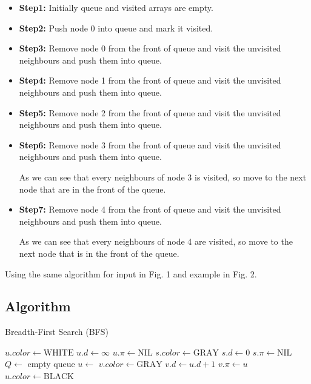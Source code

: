 \documentclass[lettersize,journal]{IEEEtran}
\begin{document}
\begin{itemize}
    \item {\textbf{Step1:} Initially queue and visited arrays are empty.}
    \item {\textbf{Step2:} Push node 0 into queue and mark it visited.}
    \item {\textbf{Step3:} Remove node 0 from the front of queue and visit the unvisited neighbours and push them into queue.}
    \item {\textbf{Step4:} Remove node 1 from the front of queue and visit the unvisited neighbours and push them into queue.}
    \item {\textbf{Step5:} Remove node 2 from the front of queue and visit the unvisited neighbours and push them into queue.}
    \item {\textbf{Step6:} Remove node 3 from the front of queue and visit the unvisited neighbours and push them into queue. 
    
    As we can see that every neighbours of node 3 is visited, so move to the next node that are in the front of the queue.}
    \item {\textbf{Step7:} Remove node 4 from the front of queue and visit the unvisited neighbours and push them into queue. 
    
    As we can see that every neighbours of node 4 are visited, so move to the next node that is in the front of the queue.}
    
\end{itemize}

Using the same algorithm for input in Fig. 1 and example in Fig. 2. \cite{bfs_gfg}

\subsection{Algorithm}

\begin{algorithm}[H]
\caption{Breadth-First Search (BFS)}\label{alg:bfs}
\begin{algorithmic}
        \State $u.color \gets \text{WHITE}$
        \State $u.d \gets \infty$
        \State $u.\pi \gets \text{NIL}$
    \EndFor
    \State $s.color \gets \text{GRAY}$
    \State $s.d \gets 0$
    \State $s.\pi \gets \text{NIL}$
    \State $Q \gets$ empty queue
    \State {}
        \State $u \gets$ 
                \State $v.color \gets \text{GRAY}$
                \State $v.d \gets u.d + 1$
                \State $v.\pi \gets u$
                \State {}
            \EndIf
        \EndFor
        \State $u.color \gets \text{BLACK}$
    \EndWhile
\EndProcedure
\end{algorithmic}
\end{algorithm}
\end{document}
